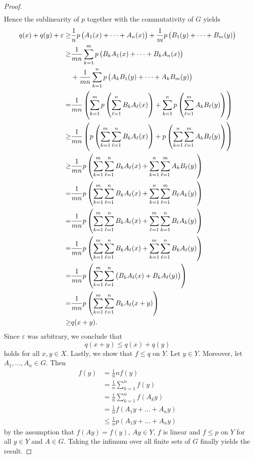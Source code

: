 \begin{enumerate}[label = \textbf{Exercise \arabic*.},wide = 0pt, itemsep = 1.5ex]
\begin{proof}
\begin{align*}
			\end{align*}
			Hence the sublinearity of $p$ together with the commutativity of $G$ yields
			\begin{align*}
				q(x) + q(y) + \varepsilon \geq &  \frac{1}{n}p\del[1]{A_1(x) + \dots + A_n(x)} + \frac{1}{m}p\del[1]{B_1(y) + \dots + B_m(y)}\\
				\geq & \frac{1}{mn} \sum_{k = 1}^m p\del[1]{B_kA_1(x) + \dots + B_kA_n(x)}\\ &+ \frac{1}{mn} \sum_{k = 1}^n p\del[1]{A_kB_1(y) + \dots + A_kB_m(y)}\\
				=& \frac{1}{mn} \del{\sum_{k = 1}^m p\del{\sum_{\ell = 1}^nB_kA_\ell(x)} + \sum_{k = 1}^n p\del{\sum_{\ell = 1}^m A_kB_\ell(y)}}\\
				\geq& \frac{1}{mn} \del{p\del{\sum_{k = 1}^m\sum_{\ell = 1}^nB_kA_\ell(x)} + p\del{\sum_{k = 1}^n\sum_{\ell = 1}^m A_kB_\ell(y)}}\\
				\geq& \frac{1}{mn} p\del{\sum_{k = 1}^m\sum_{\ell = 1}^nB_kA_\ell(x) + \sum_{k = 1}^n\sum_{\ell = 1}^m A_kB_\ell(y)}\\
				=& \frac{1}{mn} p\del{\sum_{k = 1}^m\sum_{\ell = 1}^nB_kA_\ell(x) + \sum_{k = 1}^n\sum_{\ell = 1}^m B_\ell A_k(y)}\\
				=& \frac{1}{mn} p\del{\sum_{k = 1}^m\sum_{\ell = 1}^nB_kA_\ell(x) + \sum_{\ell = 1}^m\sum_{k = 1}^n B_\ell A_k(y)}\\
				=& \frac{1}{mn} p\del{\sum_{k = 1}^m\sum_{\ell = 1}^nB_kA_\ell(x) + \sum_{k = 1}^m\sum_{\ell = 1}^n B_k A_\ell(y)}\\
				=& \frac{1}{mn} p\del{\sum_{k = 1}^m\sum_{\ell = 1}^n\del[1]{B_kA_\ell(x) + B_kA_\ell(y)}}\\
				=& \frac{1}{mn} p\del{\sum_{k = 1}^m\sum_{\ell = 1}^nB_kA_\ell(x + y)}\\
				\geq& q(x + y).
			\end{align*}
			Since $\varepsilon$ was arbitrary, we conclude that
			\begin{equation*}
				q(x + y) \leq q(x) + q(y)
			\end{equation*}
			\noindent holds for all $x,y \in X$. Lastly, we show that $f \leq q$ on $Y$. Let $y \in Y$. Moreover, let $A_1,\dots,A_n \in G$. Then
			\begin{align*}
				f(y) &= \frac{1}{n}nf(y)\\
				&= \frac{1}{n}\sum_{k = 1}^n f(y)\\
				&= \frac{1}{n}\sum_{k = 1}^n f(A_ky)\\
				&= \frac{1}{n}f(A_1y + \dots + A_ny)\\
				&\leq \frac{1}{n}p(A_1y + \dots + A_ny)
			\end{align*}
			\noindent by the assumption that $f(Ay) = f(y)$, $Ay \in Y$, $f$ is linear and $f \leq p$ on $Y$ for all $y \in Y$ and $A \in G$. Taking the infimum over all finite sets of $G$ finally yields the result. 
		\end{proof}


\end{enumerate}
